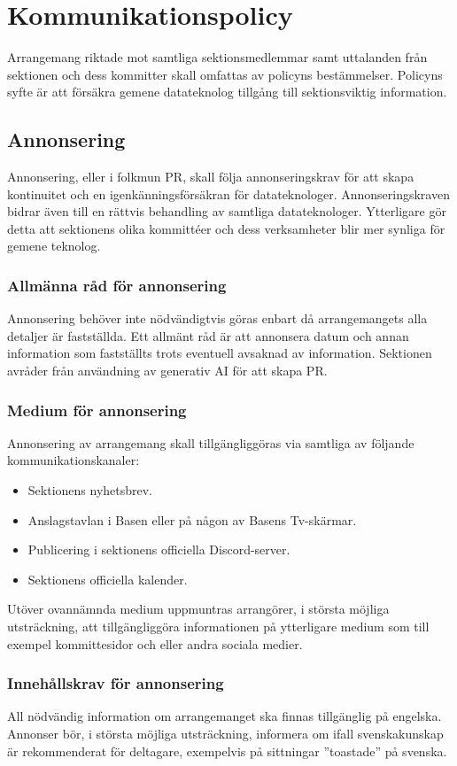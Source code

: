 \section{Kommunikationspolicy}
Arrangemang riktade mot samtliga sektionsmedlemmar samt uttalanden från sektionen och dess kommitter skall omfattas av policyns bestämmelser. Policyns syfte är att försäkra gemene datateknolog tillgång till sektionsviktig information.

\subsection{Annonsering}
Annonsering, eller i folkmun PR, skall följa annonseringskrav för att skapa kontinuitet
och en igenkänningsförsäkran för datateknologer. Annonseringskraven bidrar även till en
rättvis behandling av samtliga datateknologer. Ytterligare gör detta att sektionens olika
kommittéer och dess verksamheter blir mer synliga för gemene teknolog.

\subsubsection{Allmänna råd för annonsering}
Annonsering behöver inte nödvändigtvis göras enbart då arrangemangets alla detaljer är
fastställda. Ett allmänt råd är att annonsera datum och annan information som fastställts
trots eventuell avsaknad av information. Sektionen avråder från användning av generativ AI för att skapa PR.

\subsubsection{Medium för annonsering}
Annonsering av arrangemang skall tillgängliggöras via samtliga av följande kommunikationskanaler:
\begin{itemize}
    \item Sektionens nyhetsbrev.
    \item Anslagstavlan i Basen eller på någon av Basens Tv-skärmar.
    \item Publicering i sektionens officiella Discord-server.
    \item Sektionens officiella kalender.
\end{itemize}
Utöver ovannämnda medium uppmuntras arrangörer, i största möjliga utsträckning, att
tillgängliggöra informationen på ytterligare medium som till exempel kommittesidor och
 eller andra sociala medier.

\subsubsection{Innehållskrav för annonsering}
All nödvändig information om arrangemanget ska finnas tillgänglig på engelska. Annonser
bör, i största möjliga utsträckning, informera om ifall svenskakunskap är rekommenderat
för deltagare, exempelvis på sittningar ”toastade” på svenska.

